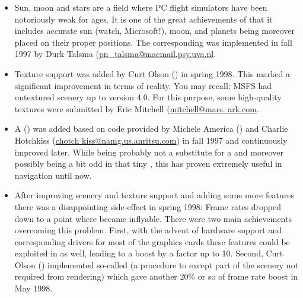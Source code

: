 \begin{itemize}

\item Sun, moon and stars are a field where PC flight simulators
 have been notoriously weak for ages. It is one of the great
 achievements of \FlightGear that it includes accurate sun (watch, Microsoft!),
 moon, and planets being moreover placed on their proper positions.
 The corresponding  was implemented in fall 1997 by Durk
 Talsma
 (\href{mailto:pn_talsma@macmail.psy.uva.nl}{pn\_talsma@macmail.psy.uva.nl}.

\item Texture support was added by Curt
Olson
 () in spring 1998. This marked a
 significant improvement in terms of reality. You may recall: MSFS had
 untextured scenery up to version 4.0. For this purpose, some high-quality
 textures were submitted by Eric Mitchell
 (\href{mailto:mitchell@mars.ark.com}{mitchell@mars. ark.com}.

\item A  () was added based on code
 provided by Michele America ()
and Charlie Hotch\-kiss
(\href{mailto:chotchkiss@namg.us.anritsu.com}{chotch kiss@namg.us.anritsu.com})
 in fall 1997 and continuously improved later.
 While being probably not a substitute for a  and moreover
 possibly being a bit odd in that tiny , this  has proven
 extremely useful in navigation until now.

\item After improving scenery and
texture support and adding some more
 features there was a disappointing side-effect in spring 1998: Frame
 rates dropped down to a point where \FlightGear became inflyable. There
 were two main achievements overcoming this problem. First, with the advent
 of hardware  support and corresponding drivers for most of
 the graphics cards these features could be exploited in
 \FlightGear as well, leading to a  boost by a
 factor up to 10. Second, Curt Olson ()
 implemented so-called  (a procedure to except part of
 the scenery not required from  rendering) which gave another 20\% or so of
 frame rate boost in May 1998.


\end{itemize}
